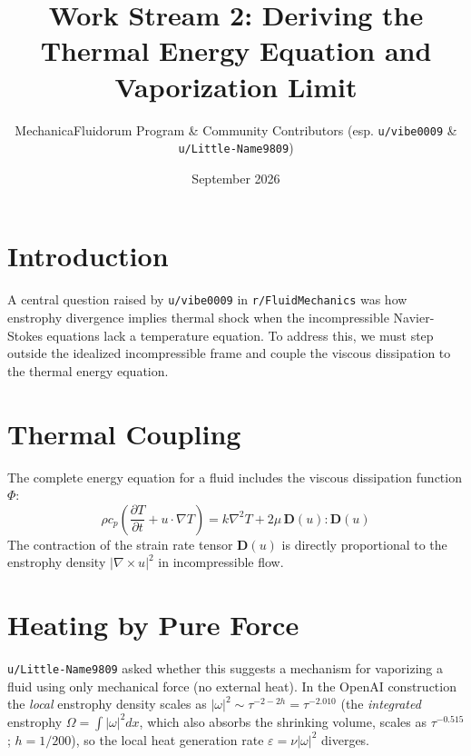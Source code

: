 \documentclass[11pt]{article}
\title{Work Stream 2: Deriving the Thermal Energy Equation and Vaporization Limit}
\author{MechanicaFluidorum Program \& Community Contributors (esp. \texttt{u/vibe0009} \& \texttt{u/Little-Name9809})}
\date{September 2026}
\begin{document}
\maketitle

\section{Introduction}
A central question raised by \texttt{u/vibe0009} in \texttt{r/FluidMechanics} was how enstrophy divergence implies thermal shock when the incompressible Navier-Stokes equations lack a temperature equation. To address this, we must step outside the idealized incompressible frame and couple the viscous dissipation to the thermal energy equation.

\section{Thermal Coupling}
The complete energy equation for a fluid includes the viscous dissipation function $\Phi$:
\begin{equation}
    \rho c_p \left( \frac{\partial T}{\partial t} + u \cdot \nabla T \right) = k \nabla^2 T + 2\mu \, \mathbf{D}(u) : \mathbf{D}(u)
\end{equation}
The contraction of the strain rate tensor $\mathbf{D}(u)$ is directly proportional to the enstrophy density $|\nabla \times u|^2$ in incompressible flow.

\section{Heating by Pure Force}
\texttt{u/Little-Name9809} asked whether this suggests a mechanism for vaporizing a fluid using only mechanical force (no external heat). In the OpenAI construction the \emph{local} enstrophy density scales as $|\omega|^2\sim\tau^{-2-2h}=\tau^{-2.010}$ (the \emph{integrated} enstrophy $\Omega=\int|\omega|^2dx$, which also absorbs the shrinking volume, scales as $\tau^{-0.515}$; $h=1/200$), so the local heat generation rate $\varepsilon=\nu|\omega|^2$ diverges.
\end{document}
